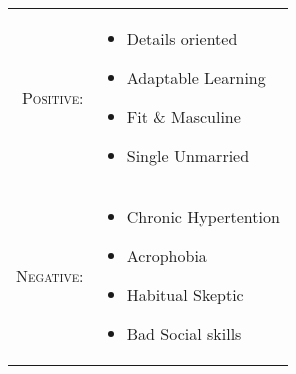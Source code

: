 %
%

\renewcommand{\arraystretch}{1.1}

\begin{tabular}{>{}r>{}p{13cm}}
    \textsc{Positive:} &
        \begin{itemize}
            \item Details oriented
            \item Adaptable Learning
            \item Fit \& Masculine
            \item Single Unmarried
        \end{itemize} \\

    \textsc{Negative:} &
        \begin{itemize}
            \item Chronic Hypertention
            \item Acrophobia
            \item Habitual Skeptic
            \item Bad Social skills
        \end{itemize}
\end{tabular}

